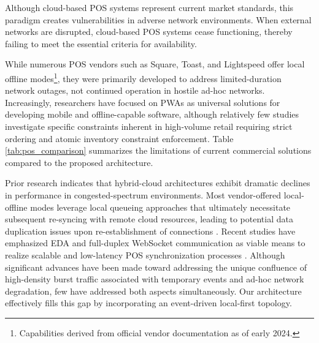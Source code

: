 \documentclass[conference]{IEEEtran}
\begin{document}
Although cloud-based POS systems represent current market standards, this paradigm creates vulnerabilities in adverse network environments. When external networks are disrupted, cloud-based POS systems cease functioning, thereby failing to meet the essential criteria for availability.

While numerous POS vendors such as Square, Toast, and Lightspeed offer local offline modes\footnote{Capabilities derived from official vendor documentation as of early 2024.}, they were primarily developed to address limited-duration network outages, not continued operation in hostile ad-hoc networks. Increasingly, researchers have focused on PWAs as universal solutions for developing mobile and offline-capable software, although relatively few studies investigate specific constraints inherent in high-volume retail requiring strict ordering and atomic inventory constraint enforcement. Table \ref{tab:pos_comparison} summarizes the limitations of current commercial solutions compared to the proposed architecture.

\begin{table}[htbp]
\caption{Feature Matrix: Commercial POS vs. Proposed Architecture}
\begin{center}
\label{tab:pos_comparison}
\end{center}
\end{table}

Prior research \cite{spinelli2021toward} indicates that hybrid-cloud architectures exhibit dramatic declines in performance in congested-spectrum environments. Most vendor-offered local-offline modes leverage local queueing approaches that ultimately necessitate subsequent re-syncing with remote cloud resources, leading to potential data duplication issues upon re-establishment of connections \cite{chowdhury2026, zhao2021}. Recent studies have emphasized EDA and full-duplex WebSocket communication as viable means to realize scalable and low-latency POS synchronization processes \cite{pramudita2022event, enache2024security}. Although significant advances have been made toward addressing the unique confluence of high-density burst traffic associated with temporary events and ad-hoc network degradation, few have addressed both aspects simultaneously. Our architecture effectively fills this gap by incorporating an event-driven local-first topology.
\end{document}
